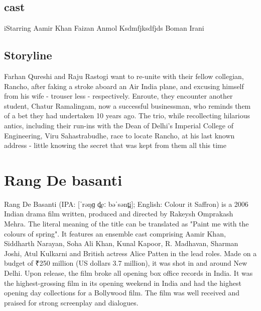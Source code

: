 \documentclass{article}
\begin{document}
\subsection{cast}
iStarring	
Aamir Khan
Faizan
Anmol
Ksdmfjksdfjds
Boman Irani

\subsection{Storyline}
Farhan Qureshi and Raju Rastogi want to re-unite with their fellow collegian, Rancho, after faking a stroke aboard an Air India plane, and excusing himself from his wife - trouser less - respectively. Enroute, they encounter another student, Chatur Ramalingam, now a successful businessman, who reminds them of a bet they had undertaken 10 years ago. The trio, while recollecting hilarious antics, including their run-ins with the Dean of Delhi's Imperial College of Engineering, Viru Sahastrabudhe, race to locate Rancho, at his last known address - little knowing the secret that was kept from them all this time


\section{Rang De basanti}
Rang De Basanti (IPA: [ˈrəŋɡ d̪eː bəˈsənt̪i]; English: Colour it Saffron) is a 2006 Indian drama film written, produced and directed by Rakeysh Omprakash Mehra. The literal meaning of the title can be translated as "Paint me with the colours of spring". It features an ensemble cast comprising Aamir Khan, Siddharth Narayan, Soha Ali Khan, Kunal Kapoor, R. Madhavan, Sharman Joshi, Atul Kulkarni and British actress Alice Patten in the lead roles. Made on a budget of ₹250 million (US dollars 3.7 million), it was shot in and around New Delhi. Upon release, the film broke all opening box office records in India. It was the highest-grossing film in its opening weekend in India and had the highest opening day collections for a Bollywood film. The film was well received and praised for strong screenplay and dialogues.
\end{document}
